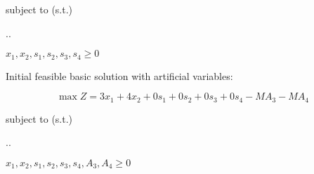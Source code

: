 \documentclass[spanish,letterpaper,11pt]{exam}
\begin{document}
\begin{questions}
\begin{solution}
    {\centering
      subject to (s.t.)
  
      \sysdelim..%
  
      \vspace{5mm}
  
      $x_1 , x_2, s_1, s_2, s_3, s_4 \geq 0$
    \par}
    

    Initial feasible basic solution with artificial variables:

    \[\max Z = 3x_1 + 4x_2 + 0s_1 + 0s_2 + 0s_3 + 0s_4 - MA_3 - MA_4\]

    {\centering
      subject to (s.t.)
  
      \sysdelim..%
  
      \vspace{5mm}
  
      $x_1 , x_2, s_1, s_2, s_3, s_4, A_3, A_4 \geq 0$
    \par}
   \end{solution}   
\end{questions}
\end{document}

